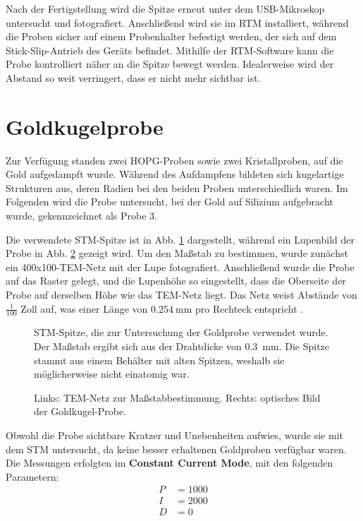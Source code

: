 \documentclass{article}
\newcommand{\defc}{black}
\newcommand{\colorT}[2][blue]{\color{#1}{#2}\color{\defc}}
\newcommand{\todo}[1]{\colorT[red]{\textbf{(#1)}}}
\begin{document}
Nach der Fertigstellung wird die Spitze erneut unter dem USB-Mikroskop untersucht und fotografiert.
Anschließend wird sie im RTM installiert, während die Proben sicher auf einem Probenhalter
befestigt werden, der sich auf dem Stick-Slip-Antrieb des Geräts befindet. Mithilfe der
RTM-Software kann die Probe kontrolliert näher an die Spitze bewegt werden. Idealerweise
wird der Abstand so weit verringert, dass er nicht mehr sichtbar ist. 

\newpage
\section{Goldkugelprobe}

Zur Verfügung standen zwei HOPG-Proben sowie zwei Kristallproben, auf die Gold aufgedampft wurde. Während des Aufdampfens bildeten sich kugelartige Strukturen aus, deren Radien bei den beiden Proben unterschiedlich waren. Im Folgenden wird die Probe untersucht, bei der Gold auf Silizium aufgebracht wurde, gekennzeichnet als Probe 3.

Die verwendete STM-Spitze ist in Abb. \ref{fig:spitze-1} dargestellt, während ein Lupenbild der Probe in Abb. \ref{fig:goldkugel-lupe} gezeigt wird. Um den Maßstab zu bestimmen, wurde zunächst ein 400x100-TEM-Netz mit der Lupe fotografiert. Anschließend wurde die Probe auf das Raster gelegt, und die Lupenhöhe so eingestellt, dass die Oberseite der Probe auf derselben Höhe wie das TEM-Netz liegt. Das Netz weist Abstände von $\frac{1}{100}$ Zoll auf, was einer Länge von $\SI{0.254}{\mm}$ pro Rechteck entspricht \cite{meshsize}.

\begin{figure}[h!]
    \centering
    \caption{STM-Spitze, die zur Untersuchung der Goldprobe verwendet wurde. Der Maßstab ergibt sich aus der Drahtdicke von \SI{0.3}{\mm}. Die Spitze stammt aus einem Behälter mit alten Spitzen, weshalb sie möglicherweise nicht einatomig war.}
    \label{fig:spitze-1}
\end{figure}
\newpage
\begin{figure}[h!]
    \centering
    \hfill
    \caption{Links: TEM-Netz zur Maßstabbestimmung. Rechts: optisches Bild der Goldkugel-Probe.}
    \label{fig:goldkugel-lupe}
\end{figure}

Obwohl die Probe sichtbare Kratzer und Unebenheiten aufwies, wurde sie mit dem STM untersucht, da keine besser erhaltenen Goldproben verfügbar waren. Die Messungen erfolgten im \textbf{Constant Current Mode}, mit den folgenden Parametern: 
\begin{align*}
    P &= 1000 \\
    I &= 2000 \\
    D &= 0
\end{align*}
\end{document}
